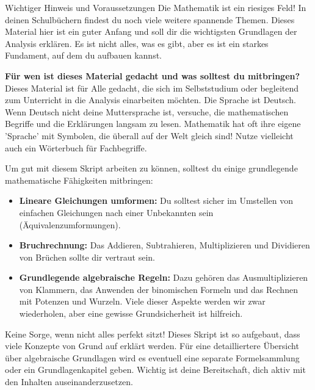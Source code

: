 \begin{infoboxumgebung}{Wichtiger Hinweis und Voraussetzungen}
Die Mathematik ist ein riesiges Feld! In deinen Schulbüchern findest du noch viele weitere spannende Themen. Dieses Material hier ist ein guter Anfang und soll dir die wichtigsten Grundlagen der Analysis erklären. Es ist nicht alles, was es gibt, aber es ist ein starkes Fundament, auf dem du aufbauen kannst.

\textbf{Für wen ist dieses Material gedacht und was solltest du mitbringen?}
Dieses Material ist für Alle gedacht, die sich im Selbststudium oder begleitend zum Unterricht in die Analysis einarbeiten möchten. Die Sprache ist Deutsch. Wenn Deutsch nicht deine Muttersprache ist, versuche, die mathematischen Begriffe und die Erklärungen langsam zu lesen. Mathematik hat oft ihre eigene 'Sprache' mit Symbolen, die überall auf der Welt gleich sind! Nutze vielleicht auch ein Wörterbuch für Fachbegriffe.

Um gut mit diesem Skript arbeiten zu können, solltest du einige grundlegende mathematische Fähigkeiten mitbringen:
\begin{itemize}
    \item \textbf{Lineare Gleichungen umformen:} Du solltest sicher im Umstellen von einfachen Gleichungen nach einer Unbekannten sein (Äquivalenzumformungen).
    \item \textbf{Bruchrechnung:} Das Addieren, Subtrahieren, Multiplizieren und Dividieren von Brüchen sollte dir vertraut sein.
    \item \textbf{Grundlegende algebraische Regeln:} Dazu gehören das Ausmultiplizieren von Klammern, das Anwenden der binomischen Formeln und das Rechnen mit Potenzen und Wurzeln. Viele dieser Aspekte werden wir zwar wiederholen, aber eine gewisse Grundsicherheit ist hilfreich.
\end{itemize}
Keine Sorge, wenn nicht alles perfekt sitzt! Dieses Skript ist so aufgebaut, dass viele Konzepte von Grund auf erklärt werden. Für eine detailliertere Übersicht über algebraische Grundlagen wird es eventuell eine separate Formelsammlung oder ein Grundlagenkapitel geben. Wichtig ist deine Bereitschaft, dich aktiv mit den Inhalten auseinanderzusetzen.
\end{infoboxumgebung}

